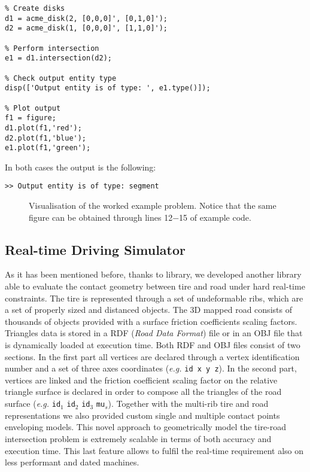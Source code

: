 \Matlab{}
\begin{verbatim}
% Create disks
d1 = acme_disk(2, [0,0,0]', [0,1,0]');
d2 = acme_disk(1, [0,0,0]', [1,1,0]');

% Perform intersection
e1 = d1.intersection(d2);

% Check output entity type
disp(['Output entity is of type: ', e1.type()]);

% Plot output
f1 = figure;
d1.plot(f1,'red');
d2.plot(f1,'blue');
e1.plot(f1,'green');
\end{verbatim}
In both cases the output is the following:
\begin{verbatim}
>> Output entity is of type: segment
\end{verbatim}

\begin{figure}[!ht]
  \centering
  
  \caption{Visualisation of the worked example problem. Notice that the same figure can be obtained through lines 12$-$15 of \Matlab{} example code.}
\end{figure}

\subsection{Real-time Driving Simulator}
As it has been mentioned before, thanks to \Acme{} library, we developed another \cpp{} library able to evaluate the contact geometry between tire and road under hard real-time constraints. The tire is represented through a set of undeformable ribs, which are a set of properly sized and distanced \Disk{} objects. The 3D mapped road consists of thousands of \Triangle{} objects provided with a surface friction coefficients scaling factors. Triangles data is stored in a RDF (\emph{Road Data Format}) file or in an OBJ file that is dynamically loaded at execution time. Both RDF and OBJ files consist of two sections. In the first part all vertices are declared through a vertex identification number and a set of three axes coordinates (\emph{e.g.} \texttt{id x y z}). In the second part, vertices are linked and the friction coefficient scaling factor on the relative triangle surface is declared in order to compose all the triangles of the road surface (\emph{e.g.} \texttt{id}$_1$ \texttt{id}$_2$ \texttt{id}$_3$ \texttt{mu}$_s$). Together with the multi-rib tire and road representations we also provided custom single and multiple contact points enveloping models. This novel approach to geometrically model the tire-road intersection problem is extremely scalable in terms of both accuracy and execution time. This last feature allows to fulfil the real-time requirement also on less performant and dated machines.

